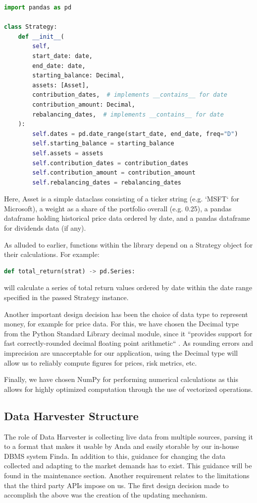 \documentclass[main.tex]{subfiles}
\begin{document}
\begin{lstlisting}[language=Python, caption=setup.py - Development environment, label=lst:Development_env]
import pandas as pd

class Strategy:
    def __init__(
        self,
        start_date: date,
        end_date: date,
        starting_balance: Decimal,
        assets: [Asset],
        contribution_dates,  # implements __contains__ for date
        contribution_amount: Decimal,
        rebalancing_dates,  # implements __contains__ for date
    ):
        self.dates = pd.date_range(start_date, end_date, freq="D")
        self.starting_balance = starting_balance
        self.assets = assets
        self.contribution_dates = contribution_dates
        self.contribution_amount = contribution_amount
        self.rebalancing_dates = rebalancing_dates
\end{lstlisting}

Here, Asset is a simple dataclass consisting of a ticker string (e.g. `MSFT` for Microsoft), a weight as a share of the portfolio overall (e.g. 0.25), a pandas dataframe holding historical price data ordered by date, and a pandas dataframe for dividends data (if any).

As alluded to earlier, functions within the library depend on a Strategy object for their calculations. For example:

\begin{lstlisting}[language=Python, caption=setup.py - Development environment, label=lst:Development_env]
def total_return(strat) -> pd.Series:
\end{lstlisting}
will calculate a series of total return values ordered by date within the date range specified in the passed Strategy instance.

Another important design decision has been the choice of data type to represent money, for example for price data. For this, we have chosen the Decimal type from the Python Standard Library decimal module, since it ``provides support for fast correctly-rounded decimal floating point arithmetic`` \cite{PyDecimal}. As rounding errors and imprecision are unacceptable for our application, using the Decimal type will allow us to reliably compute figures for prices, risk metrics, etc.

Finally, we have chosen NumPy \cite{walt2011numpy} for performing numerical calculations as this allows for highly optimized computation through the use of vectorized operations.

\subsection{Data Harvester Structure}
The role of Data Harvester is collecting live data from multiple sources, parsing it to a format that makes it usable by Anda and easily storable by our in-house DBMS system Finda. In addition to this, guidance for changing the data collected and adapting to the market demands has to exist. This guidance will be found in the maintenance section. Another requirement relates to the limitations that the third party APIs impose on us. The first design decision made to accomplish the above was the creation of the updating mechanism.
\end{document}

